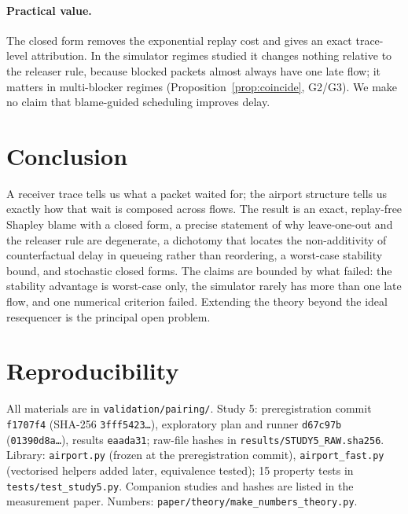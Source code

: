 \documentclass[11pt]{article}
\theoremstyle{definition}
\begin{document}
\paragraph{Practical value.} The closed form removes the exponential replay cost and gives an exact trace-level attribution. In the simulator regimes studied it changes nothing relative to the releaser rule, because blocked packets almost always have one late flow; it matters in multi-blocker regimes (Proposition~\ref{prop:coincide}, G2/G3). We make no claim that blame-guided scheduling improves delay.

\section{Conclusion}
A receiver trace tells us what a packet waited for; the airport structure tells us exactly how that wait is composed across flows. The result is an exact, replay-free Shapley blame with a closed form, a precise statement of why leave-one-out and the releaser rule are degenerate, a dichotomy that locates the non-additivity of counterfactual delay in queueing rather than reordering, a worst-case stability bound, and stochastic closed forms. The claims are bounded by what failed: the stability advantage is worst-case only, the simulator rarely has more than one late flow, and one numerical criterion failed. Extending the theory beyond the ideal resequencer is the principal open problem.

\section*{Reproducibility}
All materials are in \texttt{validation/pairing/}. Study 5: preregistration commit \texttt{f1707f4} (SHA-256 \texttt{3fff5423\dots}), exploratory plan and runner \texttt{d67c97b} (\texttt{01390d8a\dots}), results \texttt{eaada31}; raw-file hashes in \texttt{results/STUDY5\_RAW.sha256}. Library: \texttt{airport.py} (frozen at the preregistration commit), \texttt{airport\_fast.py} (vectorised helpers added later, equivalence tested); 15 property tests in \texttt{tests/test\_study5.py}. Companion studies and hashes are listed in the measurement paper. Numbers: \texttt{paper/theory/make\_numbers\_theory.py}.



\end{document}
